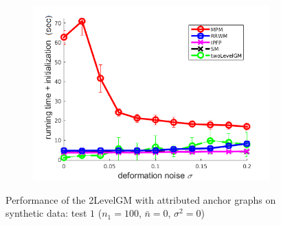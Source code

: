\begin{figure}[h]
\begin{subfigure}[b]{0.31\textwidth}
		\includegraphics[scale=0.33]{"chapter3/fig/SyntheticTest/descr/Results_v4.3.3/Test2/time_summary_avg10t"} 
	\end{subfigure} 
	\caption[Performance of the 2LevelGM with attributed anchor graphs on synthetic data (test $1$)]{Performance of the 2LevelGM with attributed anchor graphs on synthetic data: test $1$ ($n_1=100$, $\bar{n}=0$, $\sigma^2=0$)}
	\label{fig:synTest1_descr_ver433}
\end{figure}
